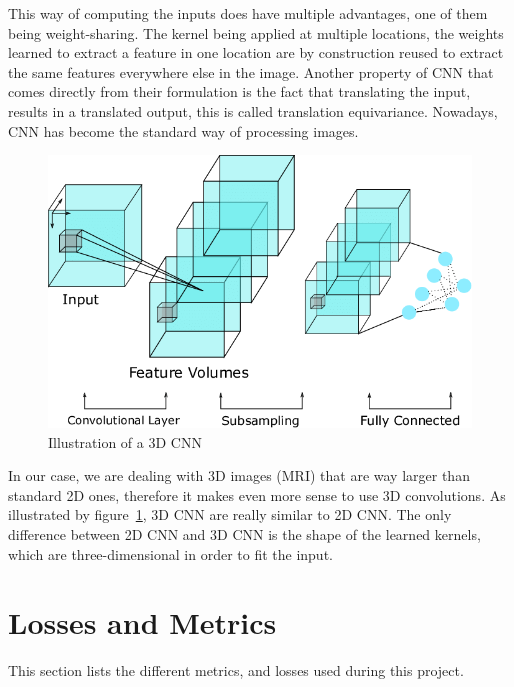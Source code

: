This way of computing the inputs does have multiple advantages, one of them being weight-sharing. The kernel being applied at multiple locations, the weights learned to extract a feature in one location are by construction reused to extract the same features everywhere else in the image. Another property of CNN that comes directly from their formulation is the fact that translating the input, results in a translated output, this is called translation equivariance. Nowadays, CNN has become the standard way of processing images.
\begin{figure}
 \centering
 \includegraphics[width=.9\linewidth]{figures/3D_CNN_example.png}
 \captionsetup{width=.9\linewidth}
 \caption[3D_CNN_example]{Illustration\footnotemark{} of a 3D CNN}
 \label{fig:3d_cnn_example}
\end{figure}


In our case, we are dealing with 3D images (MRI) that are way larger than standard 2D ones, therefore it makes even more sense to use 3D convolutions. As illustrated by figure~\ref{fig:3d_cnn_example}, 3D CNN are really similar to 2D CNN. The only difference between 2D CNN and 3D CNN is the shape of the learned kernels, which are three-dimensional in order to fit the input.


\section{Losses and Metrics}
\label{sec:losses_metrics}
This section lists the different metrics, and losses used during this project.

